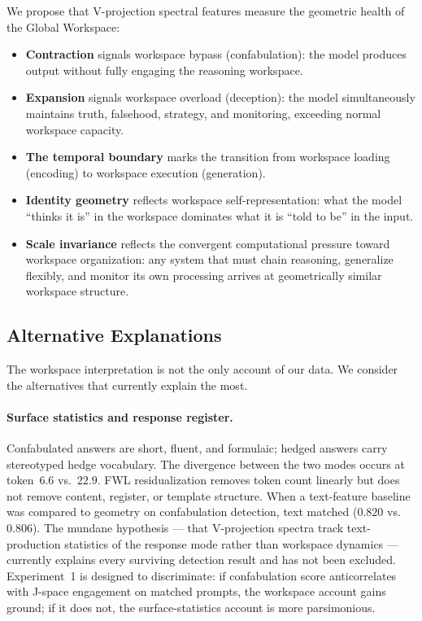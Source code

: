 \documentclass[11pt,a4paper]{article}
\begin{document}
We propose that V-projection spectral features measure the geometric
health of the Global Workspace:

\begin{itemize}[nosep]
\item \textbf{Contraction} signals workspace bypass (confabulation):
  the model produces output without fully engaging the reasoning workspace.
\item \textbf{Expansion} signals workspace overload (deception):
  the model simultaneously maintains truth, falsehood, strategy, and
  monitoring, exceeding normal workspace capacity.
\item \textbf{The temporal boundary} marks the transition from workspace
  loading (encoding) to workspace execution (generation).
\item \textbf{Identity geometry} reflects workspace self-representation:
  what the model ``thinks it is'' in the workspace dominates what it is
  ``told to be'' in the input.
\item \textbf{Scale invariance} reflects the convergent computational
  pressure toward workspace organization: any system that must chain
  reasoning, generalize flexibly, and monitor its own processing
  arrives at geometrically similar workspace structure.
\end{itemize}

\subsection{Alternative Explanations}

The workspace interpretation is not the only account of our data. We
consider the alternatives that currently explain the most.

\paragraph{Surface statistics and response register.}
Confabulated answers are short, fluent, and formulaic; hedged answers
carry stereotyped hedge vocabulary. The divergence between the two modes
occurs at token~$6.6$ vs.\ $22.9$. FWL residualization removes token
count linearly but does not remove content, register, or template
structure. When a text-feature baseline was compared to geometry on
confabulation detection, text matched ($0.820$ vs.\ $0.806$). The
mundane hypothesis --- that V-projection spectra track text-production
statistics of the response mode rather than workspace dynamics ---
currently explains every surviving detection result and has not been
excluded. Experiment~1 is designed to discriminate: if confabulation
score anticorrelates with J-space engagement on matched prompts, the
workspace account gains ground; if it does not, the surface-statistics
account is more parsimonious.
\end{document}
